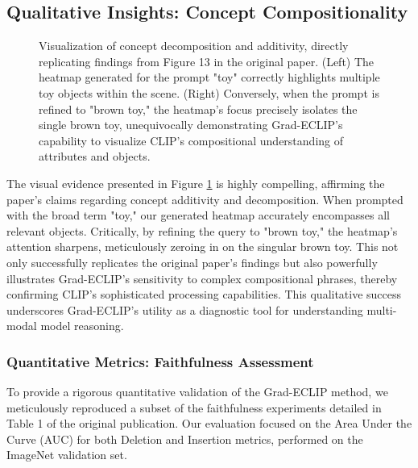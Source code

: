 \documentclass[10pt]{article} %
\begin{document}
\subsection{Qualitative Insights: Concept Compositionality}

\begin{figure}[h!]
\centering
\fbox{\rule{0pt}{4cm}\rule{\linewidth}{0pt}}
\caption{Visualization of concept decomposition and additivity, directly replicating findings from Figure 13 in the original paper. (Left) The heatmap generated for the prompt "toy" correctly highlights multiple toy objects within the scene. (Right) Conversely, when the prompt is refined to "brown toy," the heatmap's focus precisely isolates the single brown toy, unequivocally demonstrating Grad-ECLIP's capability to visualize CLIP's compositional understanding of attributes and objects.}
\label{fig:decomposition_repro}
\end{figure}

The visual evidence presented in Figure \ref{fig:decomposition_repro} is highly compelling, affirming the paper's claims regarding concept additivity and decomposition. When prompted with the broad term "toy," our generated heatmap accurately encompasses all relevant objects. Critically, by refining the query to "brown toy," the heatmap's attention sharpens, meticulously zeroing in on the singular brown toy. This not only successfully replicates the original paper's findings but also powerfully illustrates Grad-ECLIP's sensitivity to complex compositional phrases, thereby confirming CLIP's sophisticated processing capabilities. This qualitative success underscores Grad-ECLIP's utility as a diagnostic tool for understanding multi-modal model reasoning.

\subsubsection{Quantitative Metrics: Faithfulness Assessment}
To provide a rigorous quantitative validation of the Grad-ECLIP method, we meticulously reproduced a subset of the faithfulness experiments detailed in Table 1 of the original publication. Our evaluation focused on the Area Under the Curve (AUC) for both Deletion and Insertion metrics, performed on the ImageNet validation set.
\end{document}

